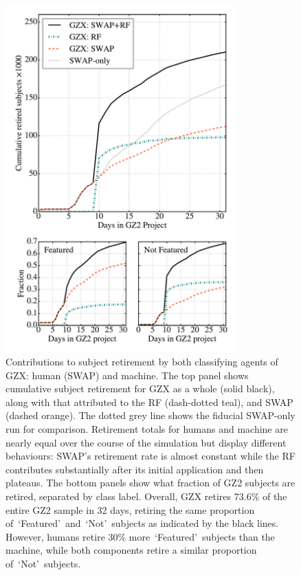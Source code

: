 \documentclass[twocolumn,  trackchanges,]{aastex6}%
\newcommand{\feat}{`Featured'}
\newcommand{\notfeat}{`Not'}
\begin{document}
\begin{figure}[t!]
\includegraphics[width=3.5in]{f8.pdf}
\caption{Contributions to subject retirement by both classifying agents of GZX: human (SWAP) and machine. The top panel shows cumulative subject retirement for GZX as a whole (solid black), along with that attributed to the RF (dash-dotted teal), and SWAP (dashed orange). The dotted grey line shows the fiducial SWAP-only run for comparison. Retirement totals for humans and machine are nearly equal over the course of the simulation but display different behaviours: SWAP's retirement rate is almost constant while the RF contributes substantially after its initial application and then plateaus.  The bottom panels show what fraction of GZ2 subjects are retired, separated by class label. Overall, GZX retires 73.6\% of the entire GZ2 sample in 32 days, retiring the same proportion of~\feat~and~\notfeat~subjects as indicated by the black lines. However, humans retire 30\% more~\feat~subjects than the machine, while both components retire a similar proportion of~\notfeat~subjects. \label{fig: gzx components}}
\end{figure}
\end{document}
